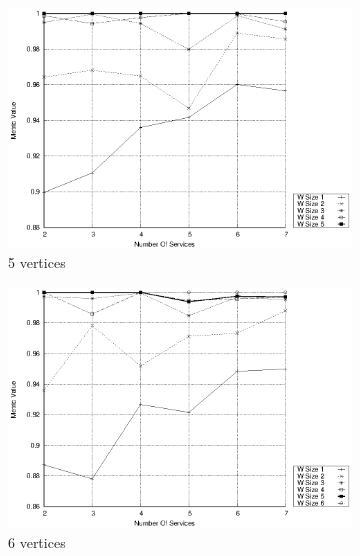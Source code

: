 \begin{figure}[h]
\begin{subfigure}{0.33\textwidth}
    \includegraphics[width=\textwidth]{Images/graphs/window_quality_performance_diff_qual_n7_s7_20_100_n5}
    \caption{5 vertices}
    \label{fig:quality_window_average_qualitative_n5}
  \end{subfigure}
  \hfill
  \begin{subfigure}{0.33\textwidth}
    \includegraphics[width=\textwidth]{Images/graphs/window_quality_performance_diff_qual_n7_s7_20_100_n6}
    \caption{6 vertices}
    \label{fig:quality_window_wide_qualitative_n6}
  \end{subfigure}
  \begin{subfigure}{0.33\textwidth}

\end{subfigure}
\end{figure}
